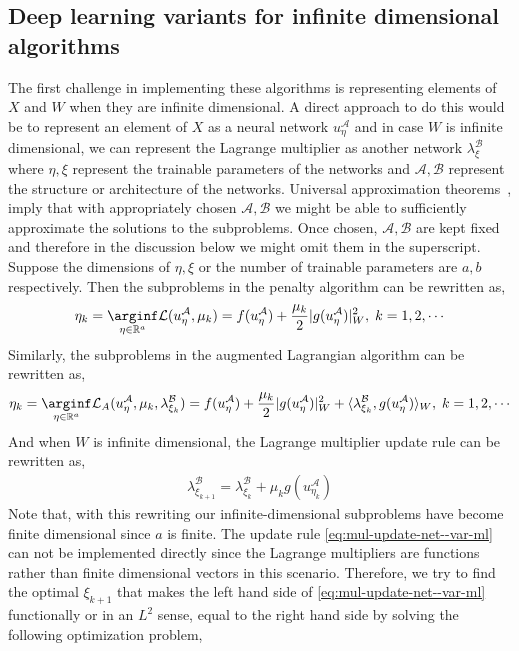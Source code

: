 \subsection{Deep learning variants for infinite dimensional algorithms}
The first challenge in implementing these algorithms is representing elements of $X$ and $W$ when they are infinite dimensional. A direct approach to do this would be to represent an element of $X$ as a neural network $u_{\eta}^\mathcal{A}$  and in case $W$ is infinite dimensional, we can represent the Lagrange multiplier as another network $\lambda_\xi^\mathcal{B}$ where $\eta, \xi$ represent the trainable parameters of the networks and $\mathcal A, \mathcal B$ represent the structure or architecture of the networks. Universal approximation theorems~\cite{pinkus1999approximation}, \cite{de2021approximation} imply that with appropriately chosen $\mathcal A, \mathcal B$ we might be able to sufficiently approximate the solutions to the subproblems. Once chosen, $\mathcal A, \mathcal B$ are kept fixed and therefore in the discussion below we might omit them in the superscript. Suppose the dimensions of $\eta, \xi$ or the number of trainable parameters are $a, b$ respectively. Then the subproblems in the penalty algorithm can be rewritten as,
\begin{align}
    \eta_k=\underset{\eta\in \mathbb R^a}\arginf \mathcal L(u_{\eta}^{\mathcal A}, \mu_k)=f(u_{\eta}^{\mathcal A}) + \frac{\mu_k}{2}|g(u_{\eta}^{\mathcal A})|_W^2,\;k=1,2,\cdots\label{eq:seq-uncon-net--var-ml}
\end{align}
Similarly, the subproblems in the augmented Lagrangian algorithm can be rewritten as, 
\begin{align}
    \eta_k=\underset{\eta\in \mathbb R^a}\arginf \mathcal L_A(u_{\eta}^{\mathcal A}, \mu_k, \lambda_{\xi_k}^{\mathcal B})=f(u_{\eta}^{\mathcal A}) + \frac{\mu_k}{2}|g(u_{\eta}^{\mathcal A})|_W^2 + \langle\lambda_{\xi_k}^{\mathcal B}, g(u_{\eta}^{\mathcal A})\rangle_W,\;k=1,2,\cdots\label{eq:seq-uncon-al-net--var-ml}
    \end{align}
And when $W$ is infinite dimensional, the Lagrange multiplier update rule can be rewritten as,
\begin{align}
\lambda_{\xi_{k+1}}^{\mathcal B} = \lambda_{\xi_k}^{\mathcal B} + \mu_k g(u_{\eta_k}^{\mathcal A})\label{eq:mul-update-net--var-ml}
\end{align}
 Note that, with this rewriting our infinite-dimensional subproblems have become finite dimensional since $a$ is finite. The update rule \eqref{eq:mul-update-net--var-ml} can not be implemented directly since the Lagrange multipliers are functions rather than finite dimensional vectors in this scenario. Therefore, we try to find the optimal $\xi_{k+1}$ that makes the left hand side of \eqref{eq:mul-update-net--var-ml} functionally or in an $L^2$ sense, equal to the right hand side by solving the following optimization problem, 
